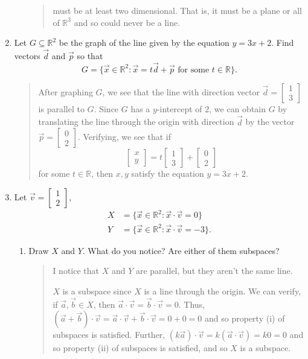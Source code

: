 \documentclass[letter]{article}
\newcommand{\R}{\mathbb{R}}
\newcommand{\mat}[1]{\begin{bmatrix}#1\end{bmatrix}}
\begin{document}
\begin{enumerate}
\begin{enumerate}
\begin{quote}
						must be at least two dimensional.  That is, it must be a plane or all of $\R^3$
						and so could never be a line.
					\end{quote}
			\end{enumerate}
		\item Let $G\subseteq \R^2$ be the graph of the line given by the equation $y=3x+2$.  Find vectors $\vec d$
			and $\vec p$ so that
			\[
				G=\{\vec x\in\R^2:\vec x=t\vec d+\vec p\text{ for some }t\in\R\}.
			\]
			\begin{quote}
				After graphing $G$, we see that the line with direction vector $\vec d=\mat{1\\3}$
				is parallel to $G$.  Since $G$ has a $y$-intercept of $2$, we can obtain $G$
				by translating the line through the origin with direction $\vec d$ by the vector
				$\vec p=\mat{0\\2}$.  Verifying, we see that if
				\[
					\mat{x\\y} = t\mat{1\\3}+\mat{0\\2}
				\]
				for some $t\in\R$, then $x,y$ satisfy the equation $y=3x+2$.
			\end{quote}
		\item Let $\vec v=\mat{1\\2}$, 
			\begin{align*}
				X&=\{\vec x\in\R^2:\vec x\cdot\vec v=0\}\\
				Y&=\{\vec x\in\R^2:\vec x\cdot \vec v=-3\}.
			\end{align*}
			\begin{enumerate}
				\item Draw $X$ and $Y$.  What do you notice?  Are either of them subspaces?
					\begin{quote}
					I notice that $X$ and $Y$ are parallel, but they aren't the same line.

					$X$ is a subspace since $X$ is a line through the origin.  We can verify, if $\vec a,\vec b\in X$,
					then $\vec a\cdot \vec v=\vec b\cdot \vec v=0$.  Thus, $(\vec a+\vec b)\cdot\vec v=\vec a\cdot\vec v
					+\vec b\cdot\vec v=0+0=0$ and so property (i) of subspaces is satisfied.  Further,
					$(k\vec a)\cdot\vec v = k(\vec a\cdot \vec v)=k0=0$ and so property (ii) of subspaces is satisfied,
					and so $X$ is a subspace.


\end{quote}
\end{enumerate}
\end{enumerate}
\end{document}
